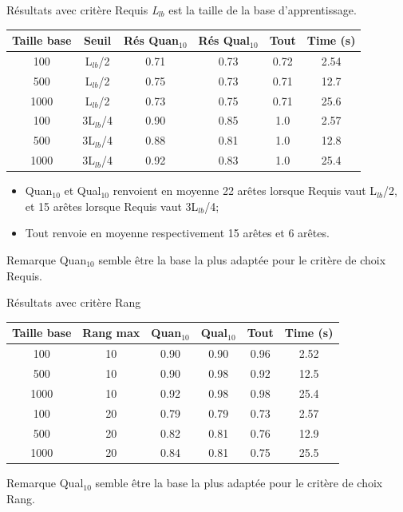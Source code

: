\documentclass{beamer}
\begin{document}
\begin{frame}{Résultats avec critère Requis}
\emph{L$_{lb}$} est la taille de la base d'apprentissage. 

\centering
\begin{tabular}{|c|c|c|c|c|c|}
   \hline
   Taille base & Seuil & Rés Quan$_{10}$ & Rés Qual$_{10}$ & Tout & Time (s)\\
   \hline
   100 & L$_{lb}$/2 & 0.71 & 0.73 & 0.72 & 2.54 \\
   \hline
   500 & L$_{lb}$/2 & 0.75 & 0.73 & 0.71 & 12.7 \\
   \hline
   1000 & L$_{lb}$/2 & 0.73 & 0.75 & 0.71 & 25.6 \\
   \hline
   \hline
   100 & 3L$_{lb}$/4 & 0.90 & 0.85 & 1.0 & 2.57 \\
   \hline
   500 & 3L$_{lb}$/4 & 0.88 & 0.81 & 1.0 & 12.8 \\
   \hline
   1000 & 3L$_{lb}$/4 & 0.92 & 0.83 & 1.0 & 25.4 \\
   \hline
\end{tabular}

\begin{itemize}
\item Quan$_{10}$ et Qual$_{10}$ renvoient en moyenne 22 arêtes lorsque Requis vaut L$_{lb}$/2, et 15 arêtes lorsque Requis vaut 3L$_{lb}$/4;
\item Tout renvoie en moyenne respectivement 15 arêtes et 6 arêtes.
\end{itemize}
\begin{exampleblock}{Remarque}
Quan$_{10}$ semble être la base la plus adaptée pour le critère de choix Requis.
\end{exampleblock}
\end{frame}

\begin{frame}{Résultats avec critère Rang}

\centering
\begin{tabular}{|c|c|c|c|c|c|}
   \hline
   Taille base & Rang max & Quan$_{10}$ & Qual$_{10}$ & Tout & Time (s)\\
   \hline
   100 & 10 & 0.90 & 0.90 & 0.96 & 2.52 \\
   \hline
   500 & 10 & 0.90 & 0.98 & 0.92 & 12.5 \\
   \hline
   1000 & 10 & 0.92 & 0.98 & 0.98 & 25.4 \\
   \hline
   \hline
   100 & 20 & 0.79 & 0.79 & 0.73 & 2.57 \\
   \hline
   500 & 20 & 0.82 & 0.81 & 0.76 & 12.9 \\
   \hline
   1000 & 20 & 0.84 & 0.81 & 0.75 & 25.5 \\
   \hline
\end{tabular}

\begin{exampleblock}{Remarque}
Qual$_{10}$ semble être la base la plus adaptée pour le critère de choix Rang.
\end{exampleblock}

\end{frame}
\end{document}
